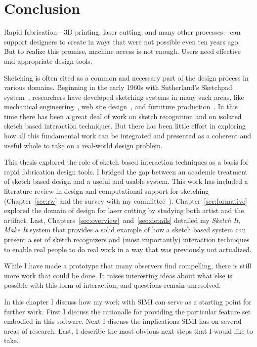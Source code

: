\chapter{Conclusion}

Rapid fabrication---3D printing, laser cutting, and many other
processes---can support designers to create in ways that were not
possible even ten years ago. But to realize this promise, machine
access is not enough. Users need effective and appropriate design
tools.

Sketching is often cited as a common and necessary part of the design
process in various domains. Beginning in the early 1960s with
Sutherland's Sketchpad system~\cite{sutherland-sketchpad}, researchers
have developed sketching systems in many such areas, like mechanical
engineering~\cite{lipson-correlation}, web site
design~\cite{lin-denim}, and furniture
production~\cite{oh-fab,saul-sketch-chair}. In this time there has
been a great deal of work on sketch recognition and on isolated sketch
based interaction techniques. But there has been little effort in
exploring how all this fundamental work can be integrated and
presented as a coherent and useful whole to take on a real-world
design problem.

This thesis explored the role of sketch based interaction techniques
as a basis for rapid fabrication design tools. I bridged the gap
between an academic treatment of sketch based design and a useful and
usable system. This work has included a literature review in design
and computational support for sketching (Chapter~\ref{sec:rw} and the
survey with my
committee~\cite{johnson-sketch-review}). Chapter~\ref{sec:formative}
explored the domain of design for laser cutting by studying both
artist and the artifact. Last,
Chapters~\ref{sec:overview}~and~\ref{sec:details} detailed my
\textit{Sketch It, Make It} system that provides a solid example of
how a sketch based system can present a set of sketch recognizers and
(most importantly) interaction techniques to enable real people to do
real work in a way that was previously not actualized.

While I have made a prototype that many observers find compelling,
there is still more work that could be done. It raises interesting
ideas about what else is possible with this form of interaction, and
questions remain unresolved.

In this chapter I discuss how my work with SIMI can serve as a
starting point for further work. First I discuss the rationalle for
providing the particular feature set embodied in this software. Next I
discuss the implications SIMI has on several areas of research. Last,
I describe the most obvious next steps that I would like to take.


